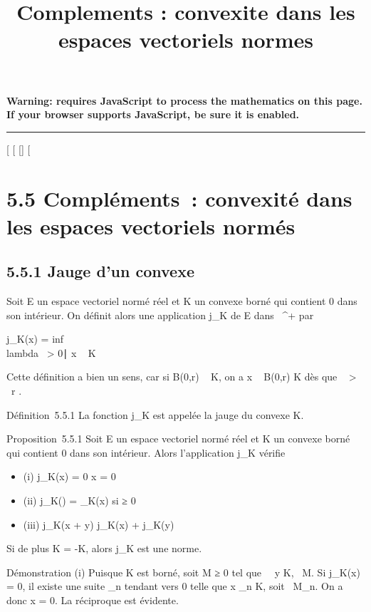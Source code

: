 \documentclass[]{article}
\title{Complements : convexite dans les espaces vectoriels normes}
\author{}
\date{}
\begin{document}
\maketitle

\textbf{Warning: 
requires JavaScript to process the mathematics on this page.\\ If your
browser supports JavaScript, be sure it is enabled.}

\begin{center}\rule{3in}{0.4pt}\end{center}

[
[
[]
[

\section{5.5 Compléments~: convexité dans les espaces vectoriels
normés}

\subsection{5.5.1 Jauge d'un convexe}

Soit E un espace vectoriel normé réel et K un convexe borné qui contient
0 dans son intérieur. On définit alors une application j_K de E
dans ~^+ par

j_K(x) = inf~ \\lambda~
> 0∣ x \over
\lambda~ \in K\

Cette définition a bien un sens, car si B(0,r) \subset~ K, on a  x
\over \lambda~ \in B(0,r) \in K dès que \lambda~ >
\x\
\over r .

Définition~5.5.1 La fonction j_K est appelée la jauge du
convexe K.

Proposition~5.5.1 Soit E un espace vectoriel normé réel et K un convexe
borné qui contient 0 dans son intérieur. Alors l'application
j_K vérifie

\begin{itemize}
\itemsep1pt\parskip0pt
\item
  (i) j_K(x) = 0 \Leftrightarrow x = 0
\item
  (ii) j_K(\mux) = \muj_K(x) si \mu ≥ 0
\item
  (iii) j_K(x + y) \leq j_K(x) + j_K(y)
\end{itemize}

Si de plus K = -K, alors j_K est une norme.

Démonstration (i) Puisque K est borné, soit M ≥ 0 tel que
\forall~~y \in K,
\y\ \leq M. Si
j_K(x) = 0, il existe une suite \lambda_n tendant vers 0
telle que  x \over \lambda_n \in K, soit
\x\ \leq M\lambda_n.
On a donc x = 0. La réciproque est évidente.
\end{document}
